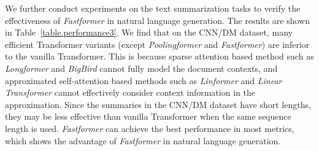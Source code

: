 \documentclass[11pt,a4paper]{article}
\begin{document}
\begin{table}[!t]
\caption{Performance of different methods in the text summarization task. Best scores are highlighted.} \label{table.performance3} 
\end{table}

We further conduct experiments on the text summarization tasks to verify the effectiveness of \textit{Fastformer} in natural language generation.
The results are shown in Table~\ref{table.performance3}.
We find that on the CNN/DM dataset, many efficient Transformer variants (except \textit{Poolingformer} and \textit{Fastformer}) are inferior to the vanilla Transformer.
This is because sparse attention based method such as \textit{Longformer} and \textit{BigBird} cannot fully model the document contexts, and approximated self-attention based methods such as \textit{Linformer} and \textit{Linear Transformer} cannot effectively consider context information in the approximation.
Since the summaries in the CNN/DM dataset have short lengths, they may  be less effective than vanilla Transformer when the same sequence length is used.
\textit{Fastformer} can achieve the best performance in most metrics, which shows the advantage of \textit{Fastformer} in natural language generation.
\end{document}
